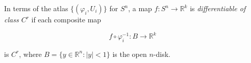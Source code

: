 In terms of the atlas $\{(\varphi_i, U_i)\}$ for $S^n$, a map $f: S^n \to \mathbb{R}^k$ is \textit{differentiable of class $C^r$} if each composite map

$$f \circ \varphi_i^{-1} : B \to \mathbb{R}^k$$

is $C^r$, where $B = \{y \in \mathbb{R}^n : |y| < 1\}$ is the open $n$-disk.
